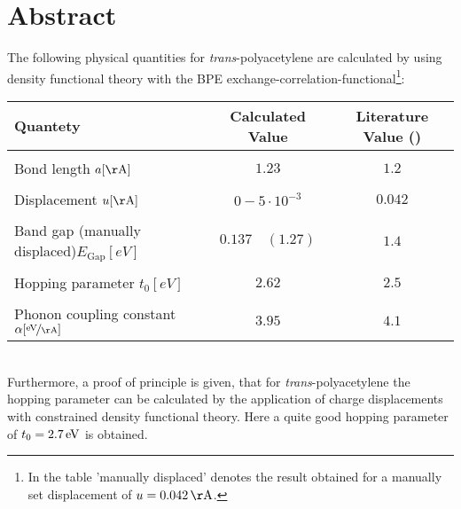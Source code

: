 \chapter*{Abstract}
The following physical quantities for \emph{trans}-polyacetylene are calculated by using density functional theory with the BPE exchange-correlation-functional\footnote{In the table 'manually displaced' denotes the result obtained for a manually set displacement of $u = \unit[0.042]{\AA}$.}:
\begin{table}[!h]
	\centering
	\begin{tabular}{l|c|c}
		Quantety & Calculated Value & Literature Value (\cite{PhysRevLett.42.1698, doi:10.1021/cr990357p})\\
		\hline \hline
		&&\\[-.3cm]
		Bond length \hfill$a [\unit{\AA}]$ & $1.23$ & $1.2$\\ \hline&&\\[-.3cm]
		Displacement \hfill$u [\unit{\AA}]$& $0 - 5\cdot10^{-3}$ & $0.042$\\ \hline&&\\[-.3cm]
		Band gap (manually displaced)\hfill$E_\text{Gap} [\unit{eV}]$ & $0.137\quad(1.27)$ & $1.4$\\ \hline &&\\[-.3cm]
		Hopping parameter \hfill$t_0 [\unit{eV}]$ & $2.62$ & $2.5$ \\ \hline&&\\[-.3cm]
		Phonon coupling constant \hspace*{2cm}$\alpha [\unitfrac{eV}{\AA}]$& $3.95$ & $4.1$
	\end{tabular}
\end{table}\\
Furthermore, a proof of principle is given, that for \emph{trans}-polyacetylene the hopping parameter can be calculated by the application of charge displacements with constrained density functional theory. Here a quite good hopping parameter of $t_0 = \unit[2.7]{eV}$ is obtained.

